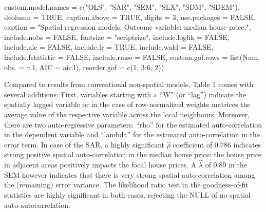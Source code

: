 \documentclass[
  letterpaper,
]{scrbook}
\newenvironment{Shaded}{\begin{snugshade}}{\end{snugshade}}
\newcommand{\AttributeTok}[1]{\textcolor[rgb]{0.40,0.45,0.13}{#1}}
\newcommand{\ConstantTok}[1]{\textcolor[rgb]{0.56,0.35,0.01}{#1}}
\newcommand{\DecValTok}[1]{\textcolor[rgb]{0.68,0.00,0.00}{#1}}
\newcommand{\FunctionTok}[1]{\textcolor[rgb]{0.28,0.35,0.67}{#1}}
\newcommand{\NormalTok}[1]{\textcolor[rgb]{0.00,0.23,0.31}{#1}}
\newcommand{\OtherTok}[1]{\textcolor[rgb]{0.00,0.23,0.31}{#1}}
\newcommand{\SpecialCharTok}[1]{\textcolor[rgb]{0.37,0.37,0.37}{#1}}
\newcommand{\StringTok}[1]{\textcolor[rgb]{0.13,0.47,0.30}{#1}}
\begin{document}
\begin{Shaded}
\begin{Highlighting}[]
          \AttributeTok{custom.model.names =} \FunctionTok{c}\NormalTok{(}\StringTok{"OLS"}\NormalTok{, }\StringTok{"SAR"}\NormalTok{, }\StringTok{"SEM"}\NormalTok{, }\StringTok{"SLX"}\NormalTok{, }\StringTok{"SDM"}\NormalTok{, }\StringTok{"SDEM"}\NormalTok{),}
          \AttributeTok{dcolumn =} \ConstantTok{TRUE}\NormalTok{, }\AttributeTok{caption.above =} \ConstantTok{TRUE}\NormalTok{, }\AttributeTok{digits =} \DecValTok{3}\NormalTok{, }\AttributeTok{use.packages =} \ConstantTok{FALSE}\NormalTok{,}
          \AttributeTok{caption =} \StringTok{"Spatial regression models. Outcome variable: median house price."}\NormalTok{,}
          \AttributeTok{include.nobs =} \ConstantTok{FALSE}\NormalTok{, }\AttributeTok{fontsize =} \StringTok{"scriptsize"}\NormalTok{,}
  \AttributeTok{include.loglik =} \ConstantTok{FALSE}\NormalTok{,}
  \AttributeTok{include.aic =} \ConstantTok{FALSE}\NormalTok{,}
  \AttributeTok{include.lr =} \ConstantTok{TRUE}\NormalTok{,}
  \AttributeTok{include.wald =} \ConstantTok{FALSE}\NormalTok{,}
  \AttributeTok{include.fstatistic =} \ConstantTok{FALSE}\NormalTok{,}
  \AttributeTok{include.rmse =} \ConstantTok{FALSE}\NormalTok{,}
  \AttributeTok{custom.gof.rows =} \FunctionTok{list}\NormalTok{(}\StringTok{\textquotesingle{}Num. obs.\textquotesingle{}} \OtherTok{=}\NormalTok{ n.l, }
                         \StringTok{\textquotesingle{}AIC\textquotesingle{}} \OtherTok{=}\NormalTok{ aic.l), }
  \AttributeTok{reorder.gof =} \FunctionTok{c}\NormalTok{(}\DecValTok{1}\NormalTok{, }\DecValTok{3}\SpecialCharTok{:}\DecValTok{6}\NormalTok{, }\DecValTok{2}\NormalTok{))}
\end{Highlighting}
\end{Shaded}



Compared to results from conventional non-spatial models, Table 1 comes
with several additions: First, variables starting with a ``W'' (or
``lag'') indicate the spatially lagged variable or in the case of
row-normalized weights matrices the average value of the respective
variable across the local neighbours. Moreover, there are two
auto-regressive parameters: ``rho'' for the estimated auto-correlation
in the dependent variable and ``lambda'' for the estimated
auto-correlation in the error term. In case of the SAR, a highly
significant \(\hat\rho\) coefficient of 0.786 indicates strong positive
spatial auto-correlation in the median house price: the house price in
adjacent areas positively impacts the focal house prices. A
\(\hat\lambda\) of 0.89 in the SEM however indicates that there is very
strong spatial auto-correlation among the (remaining) error variance.
The likelihood ratio test in the goodness-of-fit statistics are highly
significant in both cases, rejecting the NULL of no spatial
auto-autocorrelation.
\end{document}
